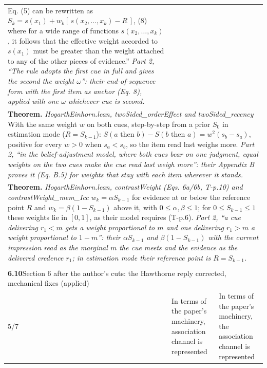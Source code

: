 \documentclass[10pt]{article}
\theoremstyle{definition}
\newlength{\fullw}\setlength{\fullw}{25.9cm}
\newcommand{\entryhead}[2]{\multicolumn{3}{|l|}{\rule{0pt}{2.6ex}\large\textbf{#1}\quad #2} \\ \hline}
\begin{document}
{\begin{longtable}{|p{0.9cm}|p{12.2cm}|p{12.2cm}|}
{Eq. (5) can be rewritten as $S_k = s(x_1) + w_k[\,s(x_2, \ldots, x_k) - R\,]$, (8)
where for a wide range of functions $s(x_2, \ldots, x_k)$, it follows that the
effective weight accorded to $s(x_1)$ must be greater than the weight attached to
any of the other pieces of evidence.'' \newline \textit{Part 2, ``The rule adopts the first cue in full and gives the second the weight $\omega$'': their end-of-sequence form with the first item as anchor (Eq. 8), applied with one $\omega$ whichever cue is second.}} \\
\multicolumn{3}{|p{\fullw}|}{\textbf{Theorem.} \textit{HogarthEinhorn.lean, twoSided\_orderEffect and twoSided\_recency} \newline With the same weight $w$ on both cues, step-by-step from a prior $S_0$ in estimation
mode ($R=S_{k-1}$): $S(a\text{ then }b)-S(b\text{ then }a)=w^{2}(s_b-s_a)$, positive for every
$w>0$ when $s_a<s_b$, so the item read last weighs more. \newline \textit{Part 2, ``in the belief-adjustment model, where both cues bear on one judgment, equal weights on the two cues make the cue read last weigh more'': their Appendix B proves it (Eq. B.5) for weights that stay with each item wherever it stands.}} \\
\multicolumn{3}{|p{\fullw}|}{\textbf{Theorem.} \textit{HogarthEinhorn.lean, contrastWeight (Eqs. 6a/6b, T-p.10) and contrastWeight\_mem\_Icc} \newline $w_k=\alpha S_{k-1}$ for evidence at or below the reference point $R$ and
$w_k=\beta(1-S_{k-1})$ above it, with $0\le\alpha,\beta\le1$; for $0\le S_{k-1}\le1$ these weights
lie in $[0,1]$, as their model requires (T-p.6). \newline \textit{Part 2, ``a cue delivering $r_1<m$ gets a weight proportional to $m$ and one delivering $r_1>m$ a weight proportional to $1-m$'': their $\alpha S_{k-1}$ and $\beta(1-S_{k-1})$ with the current impression read as the marginal $m$ the cue meets and the evidence as the delivered credence $r_1$; in estimation mode their reference point is $R=S_{k-1}$.}} \\ \hline
\multicolumn{3}{|l|}{} \\ \hline
\entryhead{6.10}{Section 6 after the author's cuts: the Hawthorne reply corrected, mechanical fixes (applied)\quad{\footnotesize\textit{(formerly C.29)}}}
5/7 & In terms of the paper's machinery, association channel is represented & In terms of the paper's machinery, the association channel is represented \\ \hline

\end{longtable}}
\end{document}
